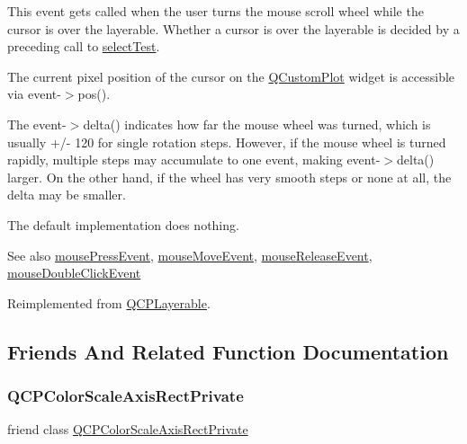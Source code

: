 This event gets called when the user turns the mouse scroll wheel while the cursor is over the layerable. Whether a cursor is over the layerable is decided by a preceding call to \mbox{\hyperlink{class_q_c_p_layout_element_ae97f483cccedadbf18ea4525ef240ee4}{select\+Test}}.

The current pixel position of the cursor on the \mbox{\hyperlink{class_q_custom_plot}{Q\+Custom\+Plot}} widget is accessible via {\ttfamily event-\/$>$pos()}.

The {\ttfamily event-\/$>$delta()} indicates how far the mouse wheel was turned, which is usually +/-\/ 120 for single rotation steps. However, if the mouse wheel is turned rapidly, multiple steps may accumulate to one event, making {\ttfamily event-\/$>$delta()} larger. On the other hand, if the wheel has very smooth steps or none at all, the delta may be smaller.

The default implementation does nothing.

\begin{DoxySeeAlso}{See also}
\mbox{\hyperlink{class_q_c_p_color_scale_a91f633b97ffcd57fdf8cd814974c20e6}{mouse\+Press\+Event}}, \mbox{\hyperlink{class_q_c_p_color_scale_a3b2bd79725aefaf2630fc76e90939442}{mouse\+Move\+Event}}, \mbox{\hyperlink{class_q_c_p_color_scale_a6a35dd39ab4e5cb2d7b29ebb4d5b61b0}{mouse\+Release\+Event}}, \mbox{\hyperlink{class_q_c_p_layerable_a4171e2e823aca242dd0279f00ed2de81}{mouse\+Double\+Click\+Event}} 
\end{DoxySeeAlso}


Reimplemented from \mbox{\hyperlink{class_q_c_p_layerable_a47dfd7b8fd99c08ca54e09c362b6f022}{Q\+C\+P\+Layerable}}.



\subsection{Friends And Related Function Documentation}
\mbox{\label{class_q_c_p_color_scale_a1441d8c09d7227c0c29a8d0a96d55bfe}} 
\subsubsection{\texorpdfstring{QCPColorScaleAxisRectPrivate}{QCPColorScaleAxisRectPrivate}}
{\footnotesize\ttfamily friend class \mbox{\hyperlink{class_q_c_p_color_scale_axis_rect_private}{Q\+C\+P\+Color\+Scale\+Axis\+Rect\+Private}}\hspace{0.3cm}{\ttfamily [friend]}}



